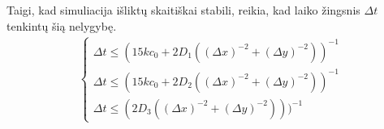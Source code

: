 Taigi, kad simuliacija išliktų skaitiškai stabili, reikia, kad laiko žingsnis $\Delta t$ tenkintų šią nelygybę.
\begin{align}
  \begin{cases}
    \Delta t \leqslant (15kc_0+2D_1((\Delta x)^{-2}+(\Delta y)^{-2}))^{-1}\\
    \Delta t \leqslant (15kc_0+2D_2((\Delta x)^{-2}+(\Delta y)^{-2}))^{-1}\\
    \Delta t \leqslant (2D_3((\Delta x)^{-2}+(\Delta y)^{-2})))^{-1}
  \end{cases}
\end{align}

